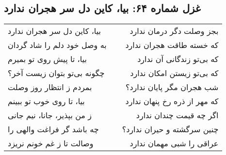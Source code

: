 \begin{center}
\section*{غزل شماره ۶۴: بیا، کاین دل سر هجران ندارد}
\label{sec:064}
\begin{longtable}{l p{0.5cm} r}
بیا، کاین دل سر هجران ندارد
&&
بجز وصلت دگر درمان ندارد
\\
به وصل خود دلم را شاد گردان
&&
که خسته طاقت هجران ندارد
\\
بیا، تا پیش روی تو بمیرم
&&
که بی‌تو زندگانی آن ندارد
\\
چگونه بی‌تو بتوان زیست آخر؟
&&
که بی‌تو زیستن امکان ندارد
\\
بمردم ز انتظار روز وصلت
&&
شب هجران مگر پایان ندارد؟
\\
بیا، تا روی خوب تو ببینم
&&
که مهر از ذره رخ پنهان ندارد
\\
ز من بپذیر، جانا، نیم جانی
&&
اگر چه قیمت چندان ندارد
\\
چه باشد گر فراغت والهی را
&&
چنین سرگشته و حیران ندارد؟
\\
وصالت تا ز غم خونم نریزد
&&
عراقی را شبی مهمان ندارد
\\
\end{longtable}
\end{center}
